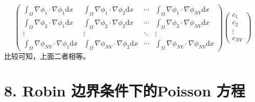 \documentclass[a4paper]{article}
\begin{document}
\begin{enumerate}
\begin{equation}
                \begin{pmatrix}
                    \int_{\Omega} \nabla \phi_1 \cdot \nabla \phi_1 \text{d}x &
                    \int_{\Omega} \nabla \phi_1 \cdot \nabla \phi_2 \text{d}x &
                    \cdots &
                    \int_{\Omega} \nabla \phi_1 \cdot \nabla \phi_{NV} \text{d}x\\
                    \int_{\Omega} \nabla \phi_2 \cdot \nabla \phi_1 \text{d}x &
                    \int_{\Omega} \nabla \phi_2 \cdot \nabla \phi_2 \text{d}x &
                    \cdots &
                    \int_{\Omega} \nabla \phi_2 \cdot \nabla \phi_{NV} \text{d}x\\
                    \vdots & \vdots & \ddots & \vdots\\
                    \int_{\Omega} \nabla \phi_{NV} \cdot \nabla \phi_1 \text{d}x &
                    \int_{\Omega} \nabla \phi_{NV} \cdot \nabla \phi_2 \text{d}x &
                    \cdots &
                    \int_{\Omega} \nabla \phi_{NV} \cdot \nabla \phi_{NV} \text{d}x
                \end{pmatrix}
                \begin{pmatrix}
                    c_1\\ c_2\\ \vdots\\ c_{NV}
                \end{pmatrix}
            \end{equation}  
            比较可知，上面二者相等。
    
\end{enumerate}

\section*{8. Robin 边界条件下的Poisson 方程}
\end{document}
